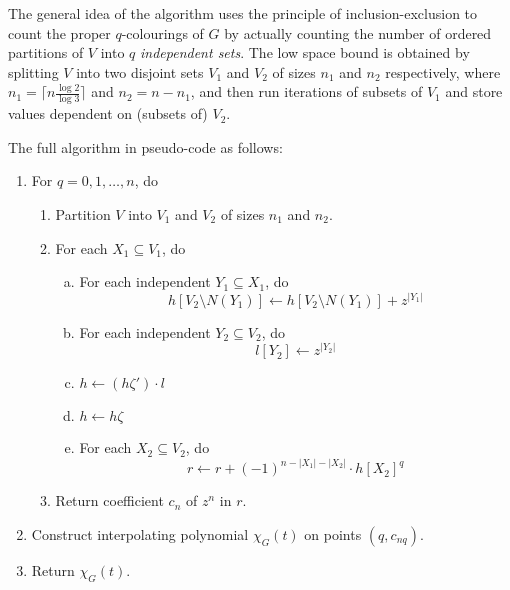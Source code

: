 \documentclass[a4paper]{article}
\begin{document}
The general idea of the algorithm uses the principle of inclusion-exclusion to count the proper $q$-colourings of $G$ by actually counting the number of ordered partitions of $V$ into $q$ \emph{independent sets}. The low space bound is obtained by splitting $V$ into two disjoint sets $V_1$ and $V_2$ of sizes $n_1$ and $n_2$ respectively, where $n_1 = \lceil n \frac{\log2}{\log3} \rceil$ and $n_2 = n - n_1$, and then run iterations of subsets of $V_1$ and store values dependent on (subsets of) $V_2$. \cite[sec 5]{cov_pack}


The full algorithm in pseudo-code as follows:

\begin{enumerate}[{Step} A.]
 \item \label{q} For $q = 0, 1, \ldots, n$, do
 \begin{enumerate}[1.]
  \item Partition $V$ into $V_1$ and $V_2$ of sizes $n_1$ and $n_2$.
  \item \label{step1} For each $X_1 \subseteq V_1$, do
  \begin{enumerate}[a)]
   \item \label{indep1} For each independent $Y_1 \subseteq X_1$, do
$$ h[V_2 \setminus N(Y_1)] \leftarrow h[V_2 \setminus N(Y_1)] + z^{|Y_1|} $$
   \item \label{indep2} For each independent $Y_2 \subseteq V_2$, do
$$ l[Y_2] \leftarrow z^{|Y_2|} $$
   \item \label{multi} $h \leftarrow (h\zeta')\cdot l$
   \item $h \leftarrow h\zeta$
   \item \label{rstep}For each $X_2 \subseteq V_2$, do
$$ r \leftarrow r + (-1)^{n - |X_1| - |X_2|}\cdot h[X_2]^q $$
  \end{enumerate}
  \item Return coefficient $c_n$ of $z^n$ in $r$.
 \end{enumerate}
 \item Construct interpolating polynomial $\chi_G(t)$ on points $(q, c_{nq})$.
 \item Return $\chi_G(t)$.
\end{enumerate}
\end{document}
